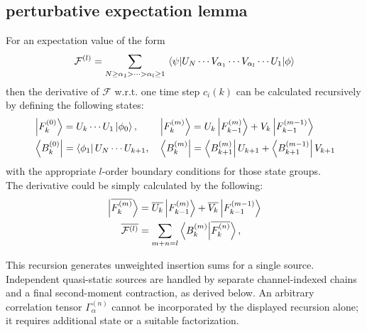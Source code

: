 \documentclass{simple-notes}
\newcommand{\dvbar}[1]{\overline{#1}}
\begin{document}
\subsection{perturbative expectation lemma}
\begin{lemma}
    For an expectation value of the form
    \begin{equation}
        \mathcal{F}^{(l)} = \sum_{N\geq\alpha_1>\cdots>\alpha_l\geq1}\mel{\psi}{U_N\cdots V_{\alpha_1} \cdots V_{\alpha_l} \cdots U_1}{\phi}
    \end{equation}
    then the derivative of $\mathcal{F}$ w.r.t. one time step $c_i(k)$ can be calculated recursively by defining the following states:
    \begin{align*}
        &\ket{F^{(0)}_k} = U_k\cdots U_1\ket{\phi_0}, &&\ket{F^{(m)}_k} = U_k\ket{F^{(m)}_{k-1}} + V_k\ket{F^{(m-1)}_{k-1}}\\
        &\bra{B^{(0)}_k} = \bra{\phi_1}U_N\cdots U_{k+1}, &&\bra{B^{(m)}_k} = \bra{B^{(m)}_{k+1}}U_{k+1} + \bra{B^{(m-1)}_{k+1}}V_{k+1}
    \end{align*}
    with the appropriate $l$-order boundary conditions for those state groups.\\
    The derivative could be simply calculated by the following:
    \begin{align*}
        \ket{\dvbar{F_k^{(m)}}} &= \dvbar{U_k}\ket{F^{(m)}_{k-1}} + \dvbar{V_k}\ket{F^{(m-1)}_{k-1}}\\
        \dvbar{\mathcal{F}^{(l)}} &= \sum_{m+n=l}\braket{B_k^{(m)}}{\dvbar{F_k^{(n)}}},
    \end{align*}
\end{lemma}
This recursion generates unweighted insertion sums for a single source.
Independent quasi-static sources are handled by separate channel-indexed
chains and a final second-moment contraction, as derived below. An arbitrary
correlation tensor $\Gamma^{(n)}_\alpha$ cannot be incorporated by the displayed
recursion alone; it requires additional state or a suitable factorization.
\end{document}
